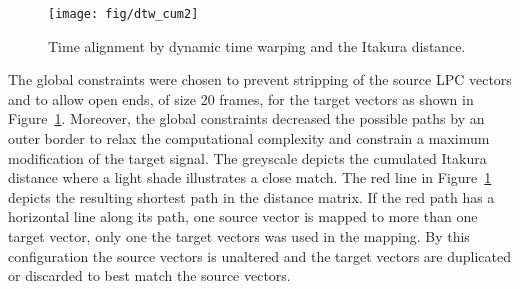 
\begin{figure}[htbp]
	\begin{center}
		\texttt{[image: fig/dtw\_cum2]}
		\caption{Time alignment by dynamic time warping and the Itakura distance.}
		\label{fig:dtw}
	\end{center}
\end{figure}
The global constraints were chosen to prevent stripping of the source LPC vectors and to allow open ends, of size 20 frames, for the target vectors as shown in Figure~\ref{fig:dtw}. Moreover, the global constraints decreased the possible paths by an outer border to relax the computational complexity and constrain a maximum modification of the target signal. The greyscale depicts the cumulated Itakura distance where a light shade illustrates a close match. The red line in Figure~\ref{fig:dtw} depicts the resulting shortest path in the distance matrix. If the red path has a horizontal line along its path, \ie one source vector is mapped to more than one target vector, only one the target vectors was used in the mapping. By this configuration the source vectors is unaltered and the target vectors are duplicated or discarded to best match the source vectors.



